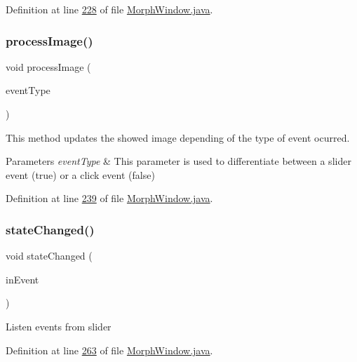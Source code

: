 Definition at line \hyperlink{_morph_window_8java_source_l00228}{228} of file \hyperlink{_morph_window_8java_source}{Morph\+Window.\+java}.

\hypertarget{classgui_1_1_morph_window_a92de44ef00adbefce701ecb95b7d926b}{}\label{classgui_1_1_morph_window_a92de44ef00adbefce701ecb95b7d926b} 
\subsubsection{\texorpdfstring{process\+Image()}{processImage()}}
{\footnotesize\ttfamily void process\+Image (\begin{DoxyParamCaption}\item[{boolean}]{event\+Type }\end{DoxyParamCaption})}

This method updates the showed image depending of the type of event ocurred.


\begin{DoxyParams}{Parameters}
{\em event\+Type} & This parameter is used to differentiate between a slider event (true) or a click event (false) \\
\hline
\end{DoxyParams}


Definition at line \hyperlink{_morph_window_8java_source_l00239}{239} of file \hyperlink{_morph_window_8java_source}{Morph\+Window.\+java}.

\hypertarget{classgui_1_1_morph_window_ad9b473bf04acd35b39c38bc7774ed52a}{}\label{classgui_1_1_morph_window_ad9b473bf04acd35b39c38bc7774ed52a} 
\subsubsection{\texorpdfstring{state\+Changed()}{stateChanged()}}
{\footnotesize\ttfamily void state\+Changed (\begin{DoxyParamCaption}\item[{Change\+Event}]{in\+Event }\end{DoxyParamCaption})}

Listen events from slider 

Definition at line \hyperlink{_morph_window_8java_source_l00263}{263} of file \hyperlink{_morph_window_8java_source}{Morph\+Window.\+java}.



